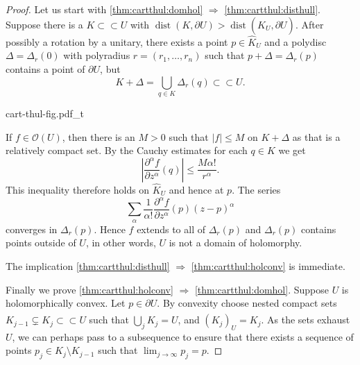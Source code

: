 \documentclass[12pt,openany]{book}
\newcommand{\sabs}[1]{\lvert {#1} \rvert}
\newcommand{\abs}[1]{\left\lvert {#1} \right\rvert}
\newcommand{\sO}{{\mathscr{O}}}
\theoremstyle{plain}
\theoremstyle{remark}
\theoremstyle{definition}
\newenvironment{myfig}{%
    \begin{center}
}{%
    \end{center}
}
\theoremstyle{exercise}
\theoremstyle{example}
\begin{document}
\begin{proof}
Let us start with \ref{thm:cartthul:domhol} $\Rightarrow$
\ref{thm:cartthul:disthull}.
Suppose there is a $K \subset
\subset U$ with $\operatorname{dist}(K,\partial U) > \operatorname{dist}(\widehat{K}_U,\partial U)$.
After possibly a rotation by a unitary,
there exists a point $p \in \widehat{K}_U$ and a polydisc
$\Delta = \Delta_r(0)$ with polyradius $r = (r_1,\ldots,r_n)$ such that
$p + \Delta = \Delta_r(p)$ contains a point of $\partial U$, but
\begin{equation*}
K + \Delta = \bigcup_{q \in K} \Delta_r(q) \subset \subset U.
\end{equation*}

\begin{myfig}
{cart-thul-fig.pdf_t}
\end{myfig}

If $f \in \sO(U)$, then there is an $M > 0$ such that $\sabs{f} \leq M$ on
$K + \Delta$ as that is a relatively compact set.  By the Cauchy estimates
for each $q \in K$ we get
\begin{equation*}
\abs{\frac{\partial^\alpha f}{\partial z^\alpha}(q)} \leq \frac{M
\alpha!}{r^\alpha} .
\end{equation*}
This inequality therefore holds on $\widehat{K}_U$ and hence at $p$.
The series
\begin{equation*}
\sum_{\alpha}
\frac{1}{\alpha !}\frac{\partial^\alpha f}{\partial z^\alpha}(p) {(z-p)}^\alpha 
\end{equation*}
converges in $\Delta_r(p)$.  Hence $f$ extends to all of $\Delta_r(p)$ and
$\Delta_r(p)$ contains points outside of $U$, in other words,
$U$ is not a domain of holomorphy.

The implication \ref{thm:cartthul:disthull} $\Rightarrow$
\ref{thm:cartthul:holconv} is immediate.

Finally we prove
\ref{thm:cartthul:holconv} $\Rightarrow$
\ref{thm:cartthul:domhol}.
Suppose $U$ is holomorphically convex.  Let $p \in \partial U$.
By convexity choose nested compact sets $K_{j-1} \subsetneq K_j \subset
\subset U$ such that $\bigcup_j K_j = U$, and $\widehat{(K_j)}_U = K_j$.
As the sets exhaust $U$, we can perhaps pass to a subsequence
to ensure that
there exists a 
sequence of points $p_j \in K_j \setminus K_{j-1}$ such that
$\lim_{j\to\infty} p_j = p$.


\end{proof}
\end{document}
